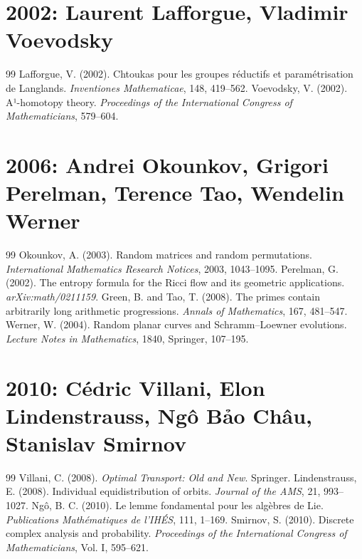 \documentclass[12pt,a4paper]{book}
\theoremstyle{definition}
\theoremstyle{remark}
\begin{document}
\section*{2002: Laurent Lafforgue, Vladimir Voevodsky}
\begin{thebibliography}{99}
 Lafforgue, V. (2002). Chtoukas pour les groupes réductifs et paramétrisation de Langlands. \emph{Inventiones Mathematicae}, 148, 419--562.
 Voevodsky, V. (2002). A¹-homotopy theory. \emph{Proceedings of the International Congress of Mathematicians}, 579--604.
\end{thebibliography}

\section*{2006: Andrei Okounkov, Grigori Perelman, Terence Tao, Wendelin Werner}
\begin{thebibliography}{99}
 Okounkov, A. (2003). Random matrices and random permutations. \emph{International Mathematics Research Notices}, 2003, 1043--1095.
 Perelman, G. (2002). The entropy formula for the Ricci flow and its geometric applications. \emph{arXiv:math/0211159}.
 Green, B. and Tao, T. (2008). The primes contain arbitrarily long arithmetic progressions. \emph{Annals of Mathematics}, 167, 481--547.
 Werner, W. (2004). Random planar curves and Schramm--Loewner evolutions. \emph{Lecture Notes in Mathematics}, 1840, Springer, 107--195.
\end{thebibliography}

\section*{2010: Cédric Villani, Elon Lindenstrauss, Ngô Bảo Châu, Stanislav Smirnov}
\begin{thebibliography}{99}
 Villani, C. (2008). \emph{Optimal Transport: Old and New}. Springer.
 Lindenstrauss, E. (2008). Individual equidistribution of orbits. \emph{Journal of the AMS}, 21, 993--1027.
 Ngô, B. C. (2010). Le lemme fondamental pour les algèbres de Lie. \emph{Publications Mathématiques de l'IHÉS}, 111, 1--169.
 Smirnov, S. (2010). Discrete complex analysis and probability. \emph{Proceedings of the International Congress of Mathematicians}, Vol. I, 595--621.
\end{thebibliography}
\end{document}
